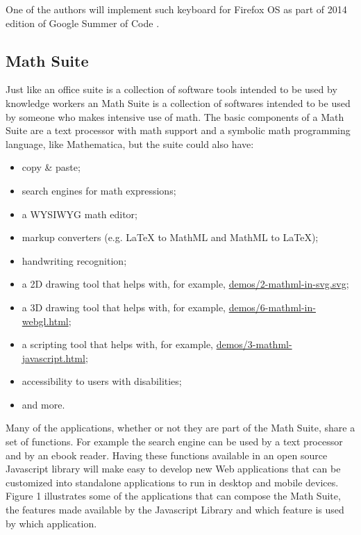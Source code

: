 One of the authors will implement such keyboard for Firefox OS as part of 2014 edition of
Google Summer of Code \cite{BugzillaMathKeyboard}.

\subsection{Math Suite}

Just like an office suite is a collection of software tools
intended to be used by
knowledge workers an Math Suite is a collection of softwares intended to be used
by someone who makes intensive use of math. The basic components of a Math
Suite are a text processor with math support and a symbolic math programming
language, like Mathematica, but the suite could also have:
\begin{itemize}
  \item copy \& paste;
  \item search engines for math expressions;
  \item a WYSIWYG math editor;
  \item markup converters (e.g. LaTeX to MathML and MathML to LaTeX);
  \item handwriting recognition;
  \item a 2D drawing tool that helps with, for example,
    \href{http://fred-wang.github.io/MathUI2014/demos/2-mathml-in-svg.svg}{demos/2-mathml-in-svg.svg};
  \item a 3D drawing tool that helps with, for example,
    \href{http://fred-wang.github.io/MathUI2014/demos/6-mathml-in-webgl.html}{demos/6-mathml-in-webgl.html};
  \item a scripting tool that helps with, for example,
    \href{http://fred-wang.github.io/MathUI2014/demos/3-mathml-javascript.html}{demos/3-mathml-javascript.html};
  \item accessibility to users with disabilities;
  \item and more.
\end{itemize}

Many of the applications, whether or not they are part of the Math Suite,
share a set of functions. For
example the search engine can be used by a text processor and by an ebook
reader. Having
these functions available in an open source Javascript library will make easy to
develop new Web applications that can be customized into standalone applications
to run in desktop and mobile devices. Figure 1 illustrates some of the
applications that can compose the Math Suite, the features made available by the
Javascript Library and which feature is used by which application.

